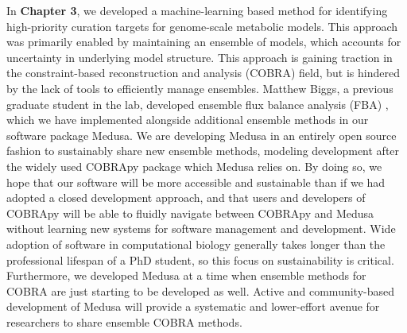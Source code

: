 \documentclass[11pt,twocolumn,notitlepage,openany,twoside]{book}
\begin{document}
\begin{refsection}
In \textbf{Chapter 3}, we developed a machine-learning based method for identifying high-priority curation targets for genome-scale metabolic models. This approach was primarily enabled by maintaining an ensemble of models, which accounts for uncertainty in underlying model structure. This approach is gaining traction in the constraint-based reconstruction and analysis (COBRA) field, but is hindered by the lack of tools to efficiently manage ensembles. Matthew Biggs, a previous graduate student in the lab, developed ensemble flux balance analysis (FBA) \cite{Biggs2017-md}, which we have implemented alongside additional ensemble methods in our software package Medusa. We are developing Medusa in an entirely open source fashion to sustainably share new ensemble methods, modeling development after the widely used COBRApy package which Medusa relies on. By doing so, we hope that our software will be more accessible and sustainable than if we had adopted a closed development approach, and that users and developers of COBRApy will be able to fluidly navigate between COBRApy and Medusa without learning new systems for software management and development. Wide adoption of software in computational biology generally takes longer than the professional lifespan of a PhD student, so this focus on sustainability is critical. Furthermore, we developed Medusa at a time when ensemble methods for COBRA are just starting to be developed as well. Active and community-based development of Medusa will provide a systematic and lower-effort avenue for researchers to share ensemble COBRA methods.


\end{refsection}
\end{document}

